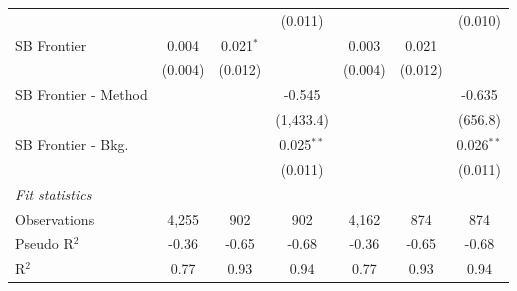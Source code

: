 \begin{tabular}{lcccccc}
                        &               &             & (0.011)        &               &         & (0.010)\\   
   SB Frontier          & 0.004         & 0.021$^{*}$ &                & 0.003         & 0.021   &   \\   
                        & (0.004)       & (0.012)     &                & (0.004)       & (0.012) &   \\   
   SB Frontier - Method &               &             & -0.545         &               &         & -0.635\\   
                        &               &             & (1,433.4)      &               &         & (656.8)\\   
   SB Frontier - Bkg.   &               &             & 0.025$^{**}$   &               &         & 0.026$^{**}$\\   
                        &               &             & (0.011)        &               &         & (0.011)\\   
   \midrule
   \emph{Fit statistics}\\
   Observations         & 4,255         & 902         & 902            & 4,162         & 874     & 874\\  
   Pseudo R$^2$         & -0.36         & -0.65       & -0.68          & -0.36         & -0.65   & -0.68\\  
   R$^2$                & 0.77          & 0.93        & 0.94           & 0.77          & 0.93    & 0.94\\  
   

\end{tabular}
